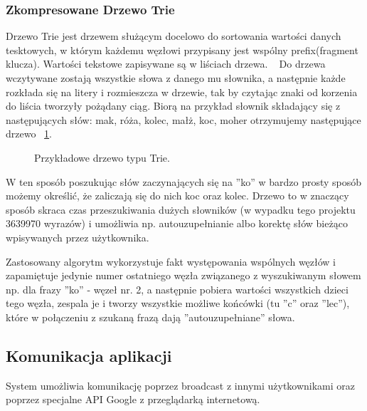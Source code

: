 \documentclass[twoside,a4paper]{book}
\begin{document}
\subsubsection{Zkompresowane Drzewo Trie}  \label{sec:trie}
Drzewo Trie jest drzewem służącym docelowo do sortowania wartości danych tesktowych, w którym każdemu węzłowi przypisany jest  wspólny prefix(fragment klucza). Wartości tekstowe zapisywane są w liściach drzewa. ~\citep{trieTree}
Do drzewa wczytywane zostają wszystkie słowa z danego mu słownika, a następnie każde rozkłada się na litery i rozmieszcza w drzewie, tak by czytając znaki od korzenia do liścia tworzyły pożądany ciąg. Biorą na przykład słownik składający się z następujących słów: mak, róża, kolec, małż, koc, moher otrzymujemy następujące drzewo ~\ref{fig:trie}.
\begin{figure}[!h]
		\centering
		\caption{Przykładowe drzewo typu Trie. }
		\label{fig:trie}
\end{figure}
W ten sposób poszukując słów zaczynających się na ''ko'' w bardzo prosty sposób możemy określić, że zaliczają się do nich koc oraz kolec. 
Drzewo to w znaczący sposób skraca czas przeszukiwania dużych słowników (w wypadku tego projektu 3639970 wyrazów) i umożliwia np. autouzupełnianie albo korektę słów bieżąco wpisywanych przez użytkownika.

Zastosowany algorytm wykorzystuje fakt występowania wspólnych węzłów i zapamiętuje jedynie numer ostatniego węzła związanego z wyszukiwanym słowem np. dla frazy ''ko'' - węzeł nr. 2, a następnie pobiera wartości wszystkich dzieci tego węzła, zespala je i tworzy wszystkie możliwe końcówki (tu ''c'' oraz ''lec''), które w połączeniu z szukaną frazą dają ''autouzupełniane'' słowa.
\subsection{Komunikacja aplikacji}
System umożliwia komunikację poprzez broadcast z innymi użytkownikami oraz poprzez specjalne API Google z przeglądarką internetową. 
\end{document}
